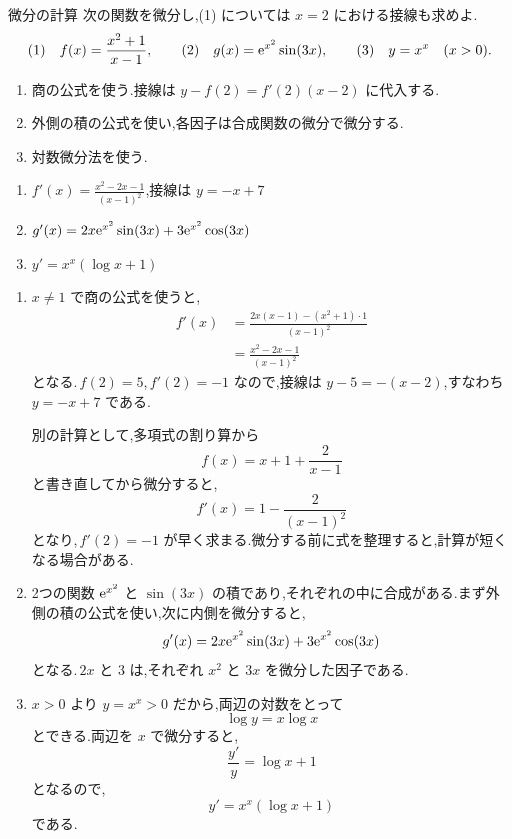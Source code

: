 \begin{example}{微分の計算}
次の関数を微分し,(1) については $x=2$ における接線も求めよ.
\[
 \text{(1)}\quad f(x)=\frac{x^2+1}{x-1},\qquad
 \text{(2)}\quad g(x)=\mathrm{e}^{x^2}\sin(3x),\qquad
 \text{(3)}\quad y=x^x\quad(x>0).
\]
\end{example}
\begin{enumerate}[label=(\arabic*)]
 \item 商の公式を使う.接線は $y-f(2)=f'(2)(x-2)$ に代入する.
 \item 外側の積の公式を使い,各因子は合成関数の微分で微分する.
 \item 対数微分法を使う.
\end{enumerate}
\begin{enumerate}[label=(\arabic*)]
 \item $f'(x)=\frac{x^2-2x-1}{(x-1)^2}$,接線は $y=-x+7$
 \item $g'(x)=2x\mathrm{e}^{x^2}\sin(3x)+3\mathrm{e}^{x^2}\cos(3x)$
 \item $y'=x^x(\log x+1)$
\end{enumerate}
\begin{enumerate}[label=(\arabic*)]
 \item $x\ne1$ で商の公式を使うと,
 \begin{align*}
  f'(x)&=\frac{2x(x-1)-(x^2+1)\cdot1}{(x-1)^2}\\
  &=\frac{x^2-2x-1}{(x-1)^2}
 \end{align*}
 となる.\,$f(2)=5$,\,$f'(2)=-1$ なので,接線は $y-5=-(x-2)$,すなわち $y=-x+7$ である.

 別の計算として,多項式の割り算から
 \[
  f(x)=x+1+\frac2{x-1}
 \]
 と書き直してから微分すると,
 \[
  f'(x)=1-\frac2{(x-1)^2}
 \]
 となり,\,$f'(2)=-1$ が早く求まる.微分する前に式を整理すると,計算が短くなる場合がある.
 \item 2つの関数 $\mathrm{e}^{x^2}$ と $\sin(3x)$ の積であり,それぞれの中に合成がある.まず外側の積の公式を使い,次に内側を微分すると,
 \[
  g'(x)=2x\mathrm{e}^{x^2}\sin(3x)+3\mathrm{e}^{x^2}\cos(3x)
 \]
 となる.\,$2x$ と $3$ は,それぞれ $x^2$ と $3x$ を微分した因子である.
 \item $x>0$ より $y=x^x>0$ だから,両辺の対数をとって
 \[
  \log y=x\log x
 \]
 とできる.両辺を $x$ で微分すると,
 \[
  \frac{y'}y=\log x+1
 \]
 となるので,
 \[
  y'=x^x(\log x+1)
 \]
 である.
\end{enumerate}
